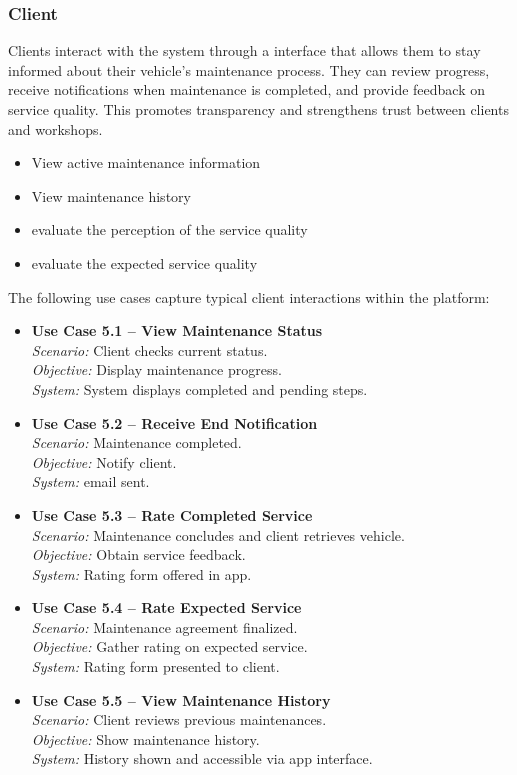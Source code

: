 \subsubsection{Client}

Clients interact with the system through a interface that allows them to stay informed about their vehicle’s maintenance process. They can review progress, receive notifications when maintenance is completed, and provide feedback on service quality. This promotes transparency and strengthens trust between clients and workshops.


\begin{itemize}
    \item View active maintenance information
    \item View maintenance history
    \item evaluate the perception of the service quality 
    \item evaluate the expected service quality 
\end{itemize}

The following use cases capture typical client interactions within the platform:

\begin{itemize}
    \item \textbf{Use Case 5.1 – View Maintenance Status}\\
    \textit{Scenario:} Client checks current status.\\
    \textit{Objective:} Display maintenance progress.\\
    \textit{System:} System displays completed and pending steps.
    \item \textbf{Use Case 5.2 – Receive End Notification}\\
    \textit{Scenario:} Maintenance completed.\\
    \textit{Objective:} Notify client.\\
    \textit{System:} email sent.
    \item \textbf{Use Case 5.3 – Rate Completed Service}\\
    \textit{Scenario:} Maintenance concludes and client retrieves vehicle.\\
    \textit{Objective:} Obtain service feedback.\\
    \textit{System:} Rating form offered in app.
    \item \textbf{Use Case 5.4 – Rate Expected Service}\\
    \textit{Scenario:} Maintenance agreement finalized.\\
    \textit{Objective:} Gather rating on expected service.\\
    \textit{System:} Rating form presented to client.
    \item \textbf{Use Case 5.5 – View Maintenance History}\\
    \textit{Scenario:} Client reviews previous maintenances.\\
    \textit{Objective:} Show maintenance history.\\
    \textit{System:} History shown and accessible via app interface.
\end{itemize}



